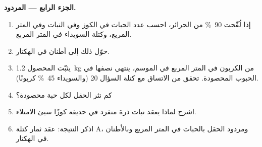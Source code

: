 \begin{problem}
\medskip
\noindent\textbf{الجزء الرابع --- المردود.}
\begin{enumerate}[resume]
  \item إذا لُقّحت \qty{90}{\%} من الحرائر، احسب عدد الحبات في
        الكوز وفي النبات وفي المتر المربع، وكتلة السويداء في المتر
        المربع.
  \item حوّل ذلك إلى أطنان في الهكتار.
  \item يثبّت المحصول \qty{1.2}{kg} من الكربون في المتر المربع في
        الموسم، ينتهي نصفها في الحبوب المحصودة. تحقق من الاتساق مع
        كتلة السؤال 20 (والسويداء \qty{45}{\%} كربونًا).
  \item كم  نثر الحقل لكل حبة محصودة؟
  \item اشرح لماذا يعقد نبات ذرة منفرد في حديقة كوزًا سيئ الامتلاء.
  \item اذكر النتيجة: عقد ثمار كتلة A، ومردود الحقل بالحبات في
        المتر المربع وبالأطنان في الهكتار.
\end{enumerate}
\end{problem}
